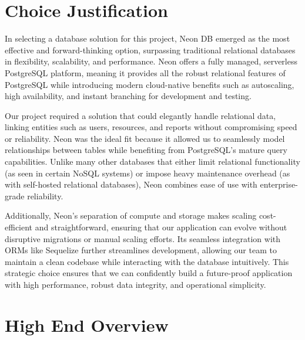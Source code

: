 \section{Choice Justification}

In selecting a database solution for this project, Neon DB emerged as the most effective and forward-thinking option, surpassing traditional relational databases in flexibility, scalability, and performance. Neon offers a fully managed, serverless PostgreSQL platform, meaning it provides all the robust relational features of PostgreSQL while introducing modern cloud-native benefits such as autoscaling, high availability, and instant branching for development and testing. 

Our project required a solution that could elegantly handle relational data, linking entities such as users, resources, and reports without compromising speed or reliability. Neon was the ideal fit because it allowed us to seamlessly model relationships between tables while benefiting from PostgreSQL’s mature query capabilities. Unlike many other databases that either limit relational functionality (as seen in certain NoSQL systems) or impose heavy maintenance overhead (as with self-hosted relational databases), Neon combines ease of use with enterprise-grade reliability. 

Additionally, Neon’s separation of compute and storage makes scaling cost-efficient and straightforward, ensuring that our application can evolve without disruptive migrations or manual scaling efforts. Its seamless integration with ORMs like Sequelize further streamlines development, allowing our team to maintain a clean codebase while interacting with the database intuitively. This strategic choice ensures that we can confidently build a future-proof application with high performance, robust data integrity, and operational simplicity.


\section{High End Overview}

